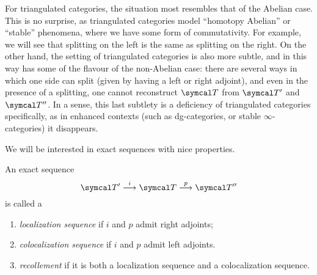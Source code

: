 For triangulated categories, the situation most resembles that of the Abelian case. This is no surprise, as triangulated categories model ``homotopy Abelian'' or ``stable'' phenomena, where we have some form of commutativity.
For example, we will see that splitting on the left is the same as splitting on the right. On the other hand, the setting of triangulated categories is also more subtle, and in this way has some of the flavour of the non-Abelian case:
there are several ways in which one side can split (given by having a left or right adjoint), and even in the presence of a splitting, one cannot reconstruct \(\calT\) from \(\calT'\) and \(\calT''\). In a sense,
this last subtlety is a deficiency of triangulated categories specifically, as in enhanced contexts (such as dg-categories, or stable \(\infty\)-categories) it disappears.

We will be interested in exact sequences with nice properties.
\begin{definition}
	An exact sequence
	\[ \calT' \overset{i}\longto \calT \overset{p}\longto \calT'' \]
	is called a
	\begin{enumerate}[label=(\arabic*)]
	\item \emph{localization sequence} if \(i\) and \(p\) admit right adjoints;
	\item \emph{colocalization sequence} if \(i\) and \(p\) admit left adjoints.
	\item \emph{recollement} if it is both a localization sequence and a colocalization sequence.
	\end{enumerate}
\end{definition}

